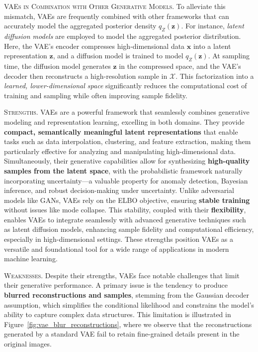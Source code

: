 \textsc{VAEs in Combination with Other Generative Models.} To alleviate this mismatch, VAEs are frequently combined with other frameworks that can accurately model the aggregated posterior density \(q_{Z}(\mathbf{z})\). For instance, \textit{latent diffusion models} \cite{rombach2022high} are employed to model the aggregated posterior distribution. Here, the VAE’s encoder compresses high-dimensional data \(\mathbf{x}\) into a latent representation \(\mathbf{z}\), and a diffusion model is trained to model \(q_{Z}(\mathbf{z})\). At sampling time, the diffusion model generates \(\mathbf{z}\) in the compressed space, and the VAE’s decoder then reconstructs a high-resolution sample in \(\mathcal{X}\). This factorization into a \emph{learned, lower-dimensional space} significantly reduces the computational cost of training and sampling while often improving sample fidelity.

\textsc{Strengths.} VAEs are a powerful framework that seamlessly combines generative modeling and representation learning, excelling in both domains. They provide \textbf{compact, semantically meaningful latent representations} that enable tasks such as data interpolation, clustering, and feature extraction, making them particularly effective for analyzing and manipulating high-dimensional data. Simultaneously, their generative capabilities allow for synthesizing \textbf{high-quality samples from the latent space}, with the probabilistic framework naturally incorporating uncertainty—a valuable property for anomaly detection, Bayesian inference, and robust decision-making under uncertainty. Unlike adversarial models like GANs, VAEs rely on the ELBO objective, ensuring \textbf{stable training} without issues like mode collapse. This stability, coupled with their \textbf{flexibility}, enables VAEs to integrate seamlessly with advanced generative techniques such as latent diffusion models, enhancing sample fidelity and computational efficiency, especially in high-dimensional settings. These strengths position VAEs as a versatile and foundational tool for a wide range of applications in modern machine learning.

\textsc{Weaknesses.} Despite their strengths, VAEs face notable challenges that limit their generative performance. A primary issue is the tendency to produce \textbf{blurred reconstructions and samples}, stemming from the Gaussian decoder assumption, which simplifies the conditional likelihood and constrains the model's ability to capture complex data structures. This limitation is illustrated in Figure~\ref{fig:vae_blur_reconstructions}, where we observe that the reconstructions generated by a standard VAE fail to retain fine-grained details present in the original images. 

